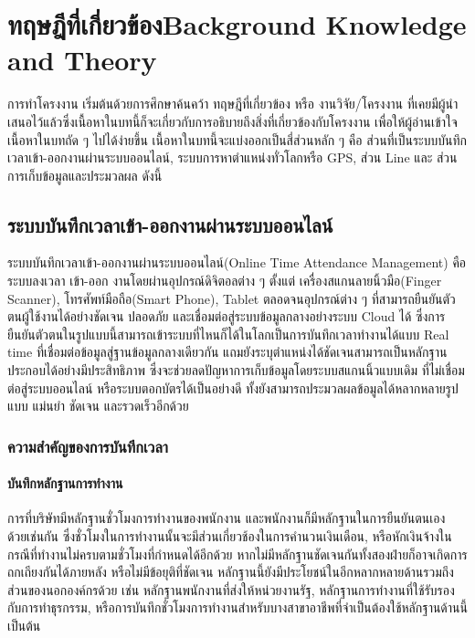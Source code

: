 \chapter{\ifcpe ทฤษฎีที่เกี่ยวข้อง\else Background Knowledge and Theory\fi}

\quad การทำโครงงาน เริ่มต้นด้วยการศึกษาค้นคว้า ทฤษฎีที่เกี่ยวข้อง หรือ งานวิจัย/โครงงาน ที่เคยมีผู้นําเสนอไว้แล้วซึ่งเนื้อหาในบทนี้ก็จะเกี่ยวกับการอธิบายถึงสิ่งที่เกี่ยวข้องกับโครงงาน เพื่อให้ผู้อ่านเข้าใจเนื้อหาในบทถัด ๆ ไปได้ง่ายขึ้น เนื้อหาในบทนี้จะแบ่งออกเป็นสี่ส่วนหลัก ๆ คือ ส่วนที่เป็นระบบบันทึกเวลาเข้า-ออกงานผ่านระบบออนไลน์, ระบบการหาตำแหน่งทั่วโลกหรือ GPS, ส่วน Line และ ส่วนการเก็บข้อมูลและประมวลผล ดังนี้ 

\section{ระบบบันทึกเวลาเข้า-ออกงานผ่านระบบออนไลน์}
\quad ระบบบันทึกเวลาเข้า-ออกงานผ่านระบบออนไลน์(Online Time Attendance Management) คือ ระบบลงเวลา เข้า-ออก งานโดยผ่านอุปกรณ์ดิจิตอลต่าง ๆ ตั้งแต่ เครื่องสแกนลายนิ้วมือ(Finger Scanner), โทรศัพท์มือถือ(Smart Phone), Tablet ตลอดจนอุปกรณ์ต่าง ๆ ที่สามารถยืนยันตัวตนผู้ใช้งานได้อย่างชัดเจน ปลอดภัย และเชื่อมต่อสู่ระบบข้อมูลกลางอย่างระบบ Cloud ได้ ซึ่งการยืนยันตัวตนในรูปแบบนี้สามารถเข้าระบบที่ไหนก็ได้ในโลกเป็นการบันทึกเวลาทำงานได้แบบ Real time ที่เชื่อมต่อข้อมูลสู่ฐานข้อมูลกลางเดียวกัน แถมยังระบุตำแหน่งได้ชัดเจนสามารถเป็นหลักฐานประกอบได้อย่างมีประสิทธิภาพ ซึ่งจะช่วยลดปัญหาการเก็บข้อมูลโดยระบบสแกนนิ้วแบบเดิม ที่ไม่เชื่อมต่อสู่ระบบออนไลน์ หรือระบบตอกบัตรได้เป็นอย่างดี ทั้งยังสามารถประมวลผลข้อมูลได้หลากหลายรูปแบบ แม่นยํา ชัดเจน และรวดเร็วอีกด้วย 

\subsection{ความสำคัญของการบันทึกเวลา}
\subsubsection{บันทึกหลักฐานการทำงาน}
\quad การที่บริษัทมีหลักฐานชั่วโมงการทำงานของพนักงาน และพนักงานก็มีหลักฐานในการยืนยันตนเอง ด้วยเช่นกัน ซึ่งชั่วโมงในการทำงานนั้นจะมีส่วนเกี่ยวช้องในการคำนวนเงินเดือน, หรือหักเงินจ้างในกรณีที่ทำงานไม่ครบตามชั่วโมงที่กำหนดได้อีกด้วย หากไม่มีหลักฐานชัดเจนกันทั้งสองฝ่ายก็อาจเกิดการถกเถียงกันได้ภายหลัง หรือไม่มีข้อยุติที่ชัดเจน หลักฐานนี้ยังมีประโยชน์ในอีกหลากหลายด้านรวมถึงส่วนของนอกองค์กรด้วย เช่น หลักฐานพนักงานที่ส่งให้หน่วยงานรัฐ, หลักฐานการทำงานที่ใช้รับรองกับการทำธุรกรรม, หรือการบันทึกชั่วโมงการทำงานสำหรับบางสาขาอาชีพที่จำเป็นต้องใช้หลักฐานด้านนี้ เป็นต้น 
